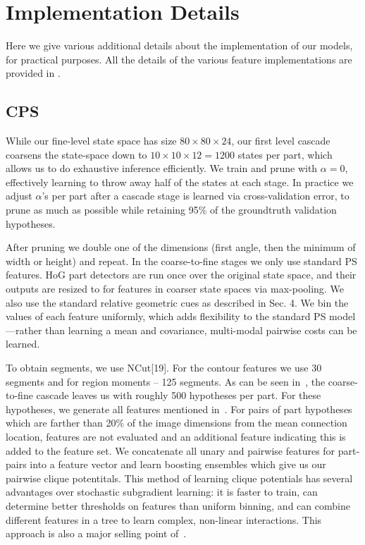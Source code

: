 \section{Implementation Details}

Here we give various additional details about the implementation of our models, 
for practical purposes.  All the details of the various feature implementations 
are provided in .

\subsection{CPS}
 While our fine-level state space has size $80 
\times 80 \times 24$, our first level cascade coarsens the state-space down to 
$10 \times 10 \times 12 = 1200$ states per part, which allows us to do 
exhaustive inference efficiently.  We train and prune with $\alpha = 0$, 
effectively learning to throw away half of the states at each stage.  In 
practice we adjust $\alpha$'s per part after a cascade stage is learned via 
cross-validation error, to prune as much as possible while retaining 95\% of 
the groundtruth validation hypotheses.

After pruning we double one of the dimensions (first angle, then the minimum of 
width or height) and repeat. In the coarse-to-fine stages we only use standard 
PS features.  HoG part detectors are run once over the original state space, 
and their outputs are resized to for features in coarser state spaces via 
max-pooling.  We also use the standard relative geometric cues as described in 
Sec.  4. We bin the values of each feature uniformly, which adds flexibility to 
the standard PS model—rather than learning a mean and covariance, multi-modal 
pairwise costs can be learned.

 To obtain segments, we use NCut[19]. For the contour 
features we use 30 segments and for region moments – 125 segments.  As can be 
seen in~, the coarse-to-fine cascade leaves us with roughly 500 
hypotheses per part.  For these hypotheses, we generate all features mentioned 
in~.  For pairs of part hypotheses which are farther than 20\% 
of the image dimensions from the mean connection location, features are not 
evaluated and an additional feature indicating this is added to the feature 
set.  We concatenate all unary and pairwise features for part-pairs into a 
feature vector and learn boosting ensembles which give us our pairwise clique 
potentitals.  This method of learning clique potentials has several advantages 
over stochastic subgradient learning: it is faster to train, can determine 
better thresholds on features than uniform binning, and can combine different 
features in a tree to learn complex, non-linear interactions.  This approach is 
also a major selling point of~\citet{dtf2011}.

